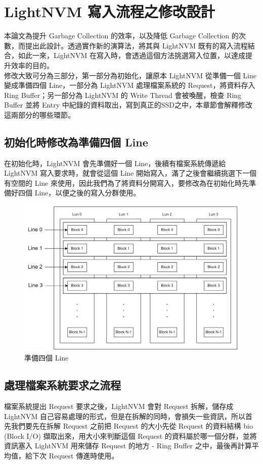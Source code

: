 \chapter{LightNVM 寫入流程之修改設計}
\indent
本論文為提升 Garbage Collection 的效率，以及降低 Garbage Collection 的次數，而提出此設計。透過實作新的演算法，將其與 LightNVM 既有的寫入流程結合，如此一來，LightNVM 在寫入時，會透過這個方法挑選寫入位置，以達成提升效率的目的。\\
\indent
修改大致可分為三部分，第一部分為初始化，讓原本 LightNVM 從準備一個 Line 變成準備四個 Line，一部分為 LightNVM 處理檔案系統的 Request，將資料存入 Ring Buffer；另一部分為 LightNVM 的 Write Thread 會被喚醒，檢查 Ring Buffer 並將 Entry 中紀錄的資料取出，寫到真正的SSD之中，本章節會解釋修改這兩部分的哪些環節。

\section{初始化時修改為準備四個 Line}\label{s3.1}
\indent
在初始化時，LightNVM 會先準備好一個 Line，後續有檔案系統傳遞給 LightNVM 寫入要求時，就會從這個 Line 開始寫入，滿了之後會繼續挑選下一個有空間的 Line 來使用，因此我們為了將資料分開寫入，要修改為在初始化時先準備好四個 Line，以便之後的寫入分群使用。

\begin{figure}[H]
    \centering
    \includegraphics[width=1\textwidth]{picture/ch3/4Line.png}
    \caption{準備四個 Line}
    \label{f3.1}
\end{figure}

\section{處理檔案系統要求之流程}\label{s3.2}
\indent
檔案系統提出 Request 要求之後，LightNVM 會對 Request 拆解，儲存成 LightNVM 自己容易處理的形式，但是在拆解的同時，會損失一些資訊，所以首先我們要先在拆解 Request 之前把 Request 的大小先從 Request 的資料結構 bio (Block I/O) \cite{10.1145/2619092}擷取出來，用大小來判斷這個 Request 的資料屬於哪一個分群，並將資訊塞入 LightNVM 用來儲存 Request 的地方 - Ring Buffer 之中，最後再計算平均值，給下次 Request 傳進時使用。\cite{LightNVM}
\newpage

